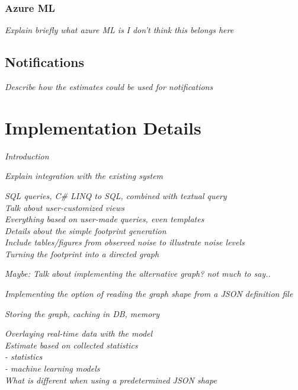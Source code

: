 \documentclass[english,12pt,a4paper,pdftex,sci,utf8]{aaltothesis}
\theoremstyle{definition}
\newcommand{\nyi}[1]{\noindent\colorbox{nyibg}{\textcolor{nyitext}{\emph{#1}}}}
\begin{document}
\subsubsection{Azure ML}
\nyi{Explain briefly what azure ML is}
\nyi{I don't think this belongs here}

\subsection{Notifications}
\nyi{Describe how the estimates could be used for notifications}



\clearpage
\section{Implementation Details}

\nyi{Introduction}

\nyi{Explain integration with the existing system}

\nyi{SQL queries, C\# LINQ to SQL, combined with textual query}\\
\nyi{Talk about user-customized views}\\
\nyi{Everything based on user-made queries, even templates}\\

\nyi{Details about the simple footprint generation}\\
\nyi{Include tables/figures from observed noise to illustrate noise levels}\\


\nyi{Turning the footprint into a directed graph}

\nyi{Maybe: Talk about implementing the alternative graph? not much to say..}

\nyi{Implementing the option of reading the graph shape from a JSON definition file}

\nyi{Storing the graph, caching in DB, memory}

\nyi{Overlaying real-time data with the model}\\

\nyi{Estimate based on collected statistics}\\
\nyi{ - statistics}\\
\nyi{ - machine learning models}\\
\nyi{What is different when using a predetermined JSON shape}
\end{document}
